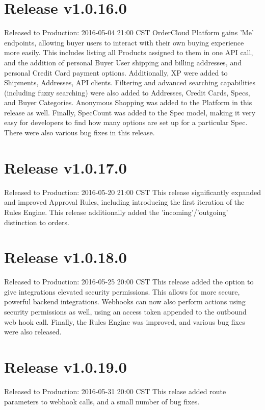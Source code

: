 \documentclass{article}%
\begin{document}
\section{Release v1.0.16.0}%
\label{sec:Release v1.0.16.0}%
Released to Production: 2016{-}05{-}04 21:00 CST%
\newline%
OrderCloud Platform gains 'Me' endpoints, allowing buyer users to interact with their own buying experience more easily. This includes listing all Products assigned to them in one API call, and the addition of personal Buyer User shipping and billing addresses, and personal Credit Card payment options. Additionally, XP were added to Shipments, Addresses, API clients. Filtering and advanced searching capabilities (including fuzzy searching) were also added to Addresses, Credit Cards, Specs, and Buyer Categories. Anonymous Shopping was added to the Platform in this release as well. Finally, SpecCount was added to the Spec model, making it very easy for developers to find how many options are set up for a particular Spec. There were also various bug fixes in this release.

%
\section{Release v1.0.17.0}%
\label{sec:Release v1.0.17.0}%
Released to Production: 2016{-}05{-}20 21:00 CST%
\newline%
This release significantly expanded and improved Approval Rules, including introducing the first iteration of the Rules Engine. This release additionally added the 'incoming'/'outgoing' distinction to orders.

%
\section{Release v1.0.18.0}%
\label{sec:Release v1.0.18.0}%
Released to Production: 2016{-}05{-}25 20:00 CST%
\newline%
This release added the option to give integrations elevated security permissions. This allows for more secure, powerful backend integrations. Webhooks can now also perform actions using security permissions as well, using an access token appended to the outbound web hook call. Finally, the Rules Engine was improved, and various bug fixes were also released.

%
\section{Release v1.0.19.0}%
\label{sec:Release v1.0.19.0}%
Released to Production: 2016{-}05{-}31 20:00 CST%
\newline%
This relase added route parameters to webhook calls, and a small number of bug fixes.
\end{document}
